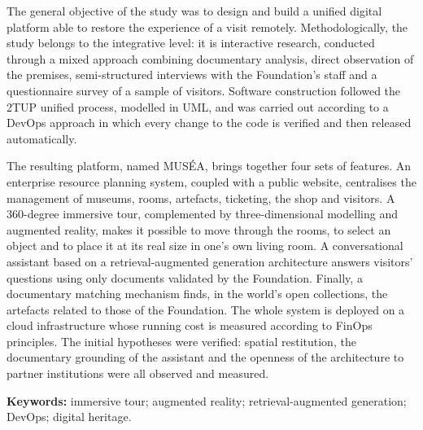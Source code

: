 The general objective of the study was to design and build a unified digital
platform able to restore the experience of a visit remotely. Methodologically,
the study belongs to the integrative level: it is interactive research,
conducted through a mixed approach combining documentary analysis, direct
observation of the premises, semi-structured interviews with the Foundation's
staff and a questionnaire survey of a sample of visitors. Software construction
followed the 2TUP unified process, modelled in UML, and was carried out
according to a DevOps approach in which every change to the code is verified and
then released automatically.

The resulting platform, named MUSÉA, brings together four sets of features. An
enterprise resource planning system, coupled with a public website, centralises
the management of museums, rooms, artefacts, ticketing, the shop and visitors.
A 360-degree immersive tour, complemented by three-dimensional modelling and
augmented reality, makes it possible to move through the rooms, to select an
object and to place it at its real size in one's own living room. A
conversational assistant based on a retrieval-augmented generation architecture
answers visitors' questions using only documents validated by the Foundation.
Finally, a documentary matching mechanism finds, in the world's open
collections, the artefacts related to those of the Foundation. The whole system
is deployed on a cloud infrastructure whose running cost is measured according
to FinOps principles. The initial hypotheses were verified: spatial
restitution, the documentary grounding of the assistant and the openness of the
architecture to partner institutions were all observed and measured.

\endgroup

\vspace{0.6cm}
\noindent\textbf{Keywords:} immersive tour; augmented reality;
retrieval-augmented generation; DevOps; digital heritage.

\cleardoublepage
{}
\begingroup
{}
\listoftables
\endgroup

\cleardoublepage
{}
\begingroup
{}
\listoffigures
\endgroup

\cleardoublepage
{}
\begingroup
\renewcommand{\contentsname}{SOMMAIRE}
\tableofcontents
\endgroup
